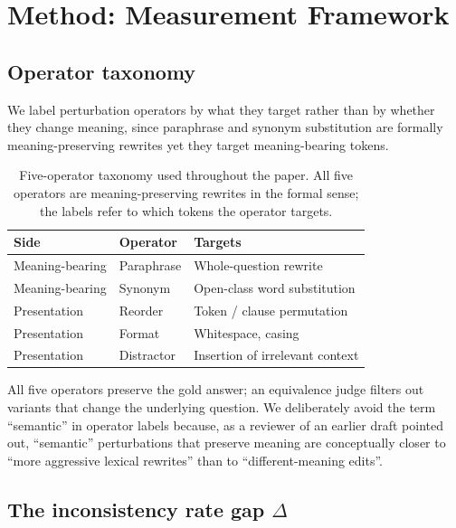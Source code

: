 \documentclass[11pt]{article}
\begin{document}
\section{Method: Measurement Framework}
\label{sec:method}

\subsection{Operator taxonomy}

We label perturbation operators by what they target rather than by whether they change meaning, since paraphrase and synonym substitution are formally meaning-preserving rewrites yet they target meaning-bearing tokens.

\begin{table}[t]
\centering
\footnotesize
\setlength{\tabcolsep}{4pt}
\begin{tabular}{@{}llp{3.0cm}@{}}
\toprule
\textbf{Side} & \textbf{Operator} & \textbf{Targets} \\
\midrule
Meaning-bearing & Paraphrase & Whole-question rewrite \\
Meaning-bearing & Synonym    & Open-class word substitution \\
Presentation    & Reorder    & Token / clause permutation \\
Presentation    & Format     & Whitespace, casing \\
Presentation    & Distractor & Insertion of irrelevant context \\
\bottomrule
\end{tabular}
\caption{Five-operator taxonomy used throughout the paper. All five operators are meaning-preserving rewrites in the formal sense; the labels refer to which tokens the operator targets.}
\label{tab:taxonomy}
\end{table}

All five operators preserve the gold answer; an equivalence judge filters out variants that change the underlying question. We deliberately avoid the term ``semantic'' in operator labels because, as a reviewer of an earlier draft pointed out, ``semantic'' perturbations that preserve meaning are conceptually closer to ``more aggressive lexical rewrites'' than to ``different-meaning edits''.

\subsection{The inconsistency rate gap $\Delta$}
\end{document}
